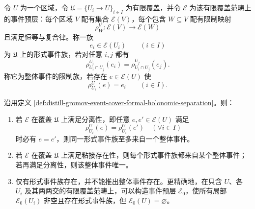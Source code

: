 \begin{definition}[事件覆盖上的形式族与整体事件]\label{def:distill-gromov-event-cover-formal-holonomic-separation}
令 \(U\) 为一个区域，令 \(\mathfrak U=\{U_i\to U\}_{i\in I}\) 为有限覆盖，并令 \(\mathscr E\) 为该有限覆盖范畴上的事件预层：每个区域 \(V\) 配有集合 \(\mathscr E(V)\)，每个包含 \(W\subseteq V\) 配有限制映射
\[
\rho^V_W:\mathscr E(V)\to\mathscr E(W)
\]
且满足恒等与复合律。称一族
\[
e_i\in\mathscr E(U_i)\qquad(i\in I)
\]
为 \(\mathfrak U\) 上的形式事件族，若对任意 \(i,j\) 都有
\[
\rho^{U_i}_{U_i\cap U_j}(e_i)=\rho^{U_j}_{U_i\cap U_j}(e_j).
\]
称它为整体事件的限制族，若存在 \(e\in\mathscr E(U)\) 使
\[
\rho^U_{U_i}(e)=e_i\qquad(i\in I).
\]
\end{definition}

\begin{proposition}[形式事件族与整体事件的分离]\label{prop:distill-gromov-event-cover-formal-holonomic-separation}
沿用定义 \ref{def:distill-gromov-event-cover-formal-holonomic-separation}。则：
\begin{enumerate}
  \item 若 \(\mathscr E\) 在覆盖 \(\mathfrak U\) 上满足分离性，即任意 \(e,e'\in\mathscr E(U)\) 满足
  \[
  \rho^U_{U_i}(e)=\rho^U_{U_i}(e')\quad(\forall i\in I)
  \]
  时必有 \(e=e'\)，则同一形式事件族至多来自一个整体事件。
  \item 若 \(\mathscr E\) 在覆盖 \(\mathfrak U\) 上满足粘接存在性，则每个形式事件族都来自某个整体事件；若再满足分离性，则该整体事件唯一。
  \item 仅有形式事件族存在，并不能推出整体事件存在。更精确地，在只含 \(U\)、各 \(U_i\) 及其两两交的有限覆盖范畴上，可以构造事件预层 \(\mathscr E_0\)，使所有局部 \(\mathscr E_0(U_i)\) 非空且存在形式事件族，但 \(\mathscr E_0(U)=\varnothing\)。
\end{enumerate}
\end{proposition}

